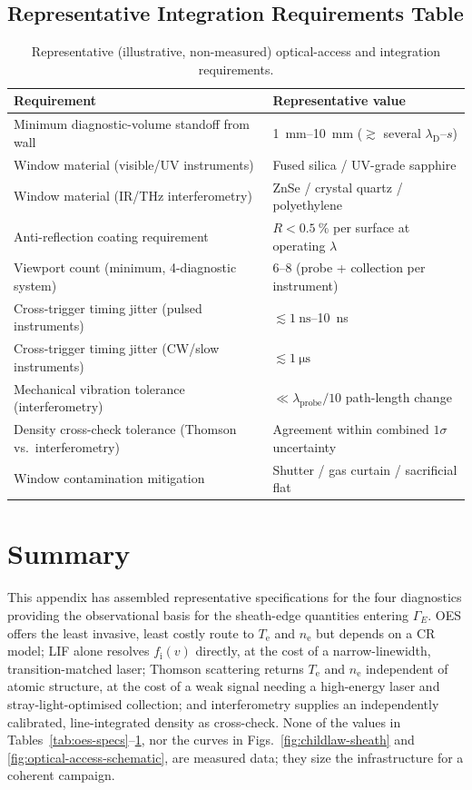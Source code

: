 \subsection{Representative Integration Requirements Table}

\begin{table}[htbp]
\centering
\caption{Representative (illustrative, non-measured) optical-access and integration requirements.}
\label{tab:integration-specs}
\begin{tabular}{@{}ll@{}}
\toprule
Requirement & Representative value \\
\midrule
Minimum diagnostic-volume standoff from wall & \SIrange{1}{10}{\milli\meter} ($\gtrsim$ several $\lambda_{\mathrm{D}}$--$s$) \\
Window material (visible/UV instruments) & Fused silica / UV-grade sapphire \\
Window material (IR/THz interferometry) & ZnSe / crystal quartz / polyethylene \\
Anti-reflection coating requirement & $R < \SI{0.5}{\percent}$ per surface at operating $\lambda$ \\
Viewport count (minimum, 4-diagnostic system) & 6--8 (probe + collection per instrument) \\
Cross-trigger timing jitter (pulsed instruments) & $\lesssim \SI{1}{\nano\second}$--\SI{10}{\nano\second} \\
Cross-trigger timing jitter (CW/slow instruments) & $\lesssim \SI{1}{\micro\second}$ \\
Mechanical vibration tolerance (interferometry) & $\ll \lambda_{\mathrm{probe}}/10$ path-length change \\
Density cross-check tolerance (Thomson vs.\ interferometry) & Agreement within combined $1\sigma$ uncertainty \\
Window contamination mitigation & Shutter / gas curtain / sacrificial flat \\
\bottomrule
\end{tabular}
\end{table}

\section{Summary}
\label{sec:specs-summary}

This appendix has assembled representative specifications for the four diagnostics providing the observational basis for the sheath-edge quantities entering $\Gamma_{E}$. OES offers the least invasive, least costly route to $T_{\mathrm{e}}$ and $n_{\mathrm{e}}$ but depends on a CR model; LIF alone resolves $f_{\mathrm{i}}(v)$ directly, at the cost of a narrow-linewidth, transition-matched laser; Thomson scattering returns $T_{\mathrm{e}}$ and $n_{\mathrm{e}}$ independent of atomic structure, at the cost of a weak signal needing a high-energy laser and stray-light-optimised collection; and interferometry supplies an independently calibrated, line-integrated density as cross-check. None of the values in Tables~\ref{tab:oes-specs}--\ref{tab:integration-specs}, nor the curves in Figs.~\ref{fig:childlaw-sheath} and \ref{fig:optical-access-schematic}, are measured data; they size the infrastructure for a coherent campaign.
